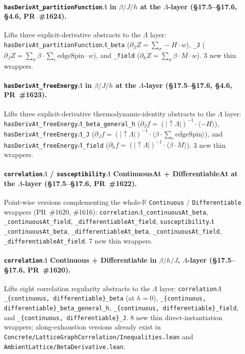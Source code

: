 \documentclass[a4paper,11pt]{article}
\newcommand{\LeanLambda}{\texorpdfstring{\ensuremath{\Lambda}}{Lambda}}
\begin{document}
\paragraph{\texttt{hasDerivAt\_partitionFunction\LeanLambda} in $\beta / J
/ h$ at the $\Lambda$-layer (\S17.5--\S17.6, \S4.6, PR~\#1624).}
Lifts three explicit-derivative abstracts to the $\Lambda$
layer: \texttt{hasDerivAt\_partitionFunction\LeanLambda\_beta}
($\partial_\beta Z = \sum_\sigma -H \cdot w$),
\texttt{\_J} ($\partial_J Z = \sum_\sigma \beta \cdot \sum_e
\mathrm{edgeSpin} \cdot w$), and \texttt{\_field}
($\partial_h Z = \sum_\sigma \beta \cdot M \cdot w$). 3 new thin
wrappers.

\paragraph{\texttt{hasDerivAt\_freeEnergy\LeanLambda} in $\beta / J / h$ at
the $\Lambda$-layer (\S17.5--\S17.6, \S4.6, PR~\#1623).} Lifts
three explicit-derivative thermodynamic-identity abstracts to
the $\Lambda$ layer:
\texttt{hasDerivAt\_freeEnergy\LeanLambda\_beta\_general\_h}
($\partial_\beta f = (|\!\uparrow\!\Lambda|)^{-1} \cdot \langle
-H\rangle$),
\texttt{hasDerivAt\_freeEnergy\LeanLambda\_J}
($\partial_J f = (|\!\uparrow\!\Lambda|)^{-1} \cdot \langle
\beta \cdot \sum_e \mathrm{edgeSpin}\rangle$), and
\texttt{hasDerivAt\_freeEnergy\LeanLambda\_field}
($\partial_h f = (|\!\uparrow\!\Lambda|)^{-1} \cdot \langle
\beta \cdot M\rangle$). 3 new thin wrappers.

\paragraph{\texttt{correlation\LeanLambda} / \texttt{susceptibility\LeanLambda}
ContinuousAt + DifferentiableAt at the $\Lambda$-layer
(\S17.5--\S17.6, PR~\#1622).} Point-wise versions
complementing the whole-$\mathbb{R}$ \texttt{Continuous} /
\texttt{Differentiable} wrappers (PR~\#1620, \#1616):
\texttt{correlation\LeanLambda\_continuousAt\_beta},
\texttt{\_continuousAt\_field},
\texttt{\_differentiableAt\_field},
\texttt{susceptibility\LeanLambda\_continuousAt\_beta},
\texttt{\_differentiableAt\_beta},
\texttt{\_continuousAt\_field},
\texttt{\_differentiableAt\_field}. 7 new thin wrappers.

\paragraph{\texttt{correlation\LeanLambda} Continuous + Differentiable in
$\beta / h / J$, $\Lambda$-layer (\S17.5--\S17.6, PR~\#1620).}
Lifts eight correlation regularity abstracts to the $\Lambda$
layer:
\texttt{correlation\LeanLambda\_\{continuous, differentiable\}\_beta} (at
$h = 0$),
\texttt{\_\{continuous, differentiable\}\_beta\_general\_h},
\texttt{\_\{continuous, differentiable\}\_field}, and
\texttt{\_\{continuous, differentiable\}\_J}. 8 new thin
direct-instantiation wrappers; along-exhaustion versions
already exist in
\texttt{Concrete/LatticeGraphCorrelation/Inequalities.lean} and
\texttt{AmbientLattice/BetaDerivative.lean}.
\end{document}
